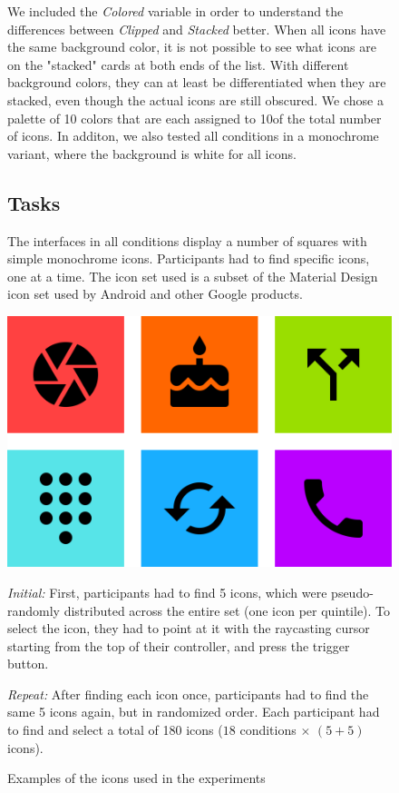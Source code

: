 \documentclass{tufte-book} %
\begin{document}
\begin{figure}
We included the \emph{Colored} variable in order to understand the differences between \emph{Clipped} and \emph{Stacked} better. When all icons have the same background color, it is not possible to see what icons are on the "stacked" cards at both ends of the list. With different background colors, they can at least be differentiated when they are stacked, even though the actual icons are still obscured. We chose a palette of 10 colors that are each assigned to 10\percent of the total number of icons. In additon, we also tested all conditions in a monochrome variant, where the background is white for all icons.

\subsection{Tasks}
The interfaces in all conditions display a number of squares with simple monochrome icons. Participants had to find specific icons, one at a time. The icon set used is a subset of the Material Design icon set used by Android and other Google products.

\begin{marginfigure}
  \includegraphics[width=\linewidth]{material-icons.png}
  \caption{Examples of the icons used in the experiments}
  \label{fig:material-icons}
\end{marginfigure}

\emph{Initial:} First, participants had to find 5 icons, which were pseudo-randomly distributed across the entire set (one icon per quintile). To select the icon, they had to point at it with the raycasting cursor starting from the top of their controller, and press the trigger button.

\emph{Repeat:} After finding each icon once, participants had to find the same 5 icons again, but in randomized order. Each participant had to find and select a total of 180 icons ($18$ conditions $\times$ $(5 + 5) $ icons).


\end{figure}
\end{document}
